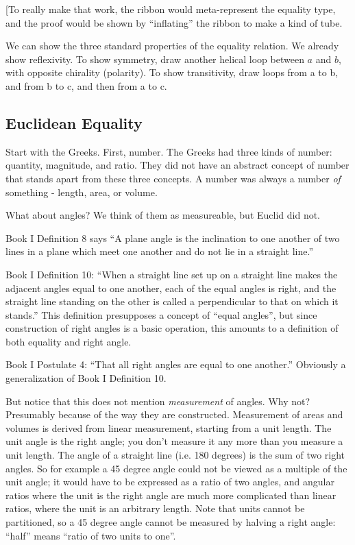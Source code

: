 \documentclass{article}
\begin{document}
[To really make that work, the ribbon would meta-represent the
  equality type, and the proof would be shown by ``inflating'' the
  ribbon to make a kind of tube.

We can show the three standard properties of the equality relation. We
already show reflexivity. To show symmetry, draw another helical loop
between \(a\) and \(b\), with opposite chirality (polarity). To show
transitivity, draw loops from a to b, and from b to c, and then from a
to c.

\subsection{Euclidean Equality \\}

Start with the Greeks. First, number. The Greeks had three kinds of
number: quantity, magnitude, and ratio. They did not have an abstract
concept of number that stands apart from these three concepts. A
number was always a number \textit{of} something - length, area, or
volume.

What about angles? We think of them as measureable, but Euclid did
not.

Book I Definition 8 says \enquote{A plane angle is the
  inclination to one another of two lines in a plane which meet one
  another and do not lie in a straight line.}

Book I Definition 10: \enquote{When a straight line set up on a
  straight line makes the adjacent angles equal to one another, each
  of the equal angles is right, and the straight line standing on the
  other is called a perpendicular to that on which it stands.} This
definition presupposes a concept of ``equal angles'', but since
construction of right angles is a basic operation, this amounts to a
definition of both equality and right angle.

Book I Postulate 4: \enquote{That all right angles are equal to one another.}
Obviously a generalization of Book I Definition 10.

But notice that this does not mention \textit{measurement} of angles.
Why not? Presumably because of the way they are constructed.
Measurement of areas and volumes is derived from linear measurement,
starting from a unit length. The unit angle is the right angle; you
don't measure it any more than you measure a unit length. The angle of
a straight line (i.e. 180 degrees) is the sum of two right angles. So
for example a 45 degree angle could not be viewed as a multiple of the
unit angle; it would have to be expressed as a ratio of two angles,
and angular ratios where the unit is the right angle are much more
complicated than linear ratios, where the unit is an arbitrary length.
Note that units cannot be partitioned, so a 45 degree angle cannot be
measured by halving a right angle: ``half'' means ``ratio of two units
to one''.
\end{document}
